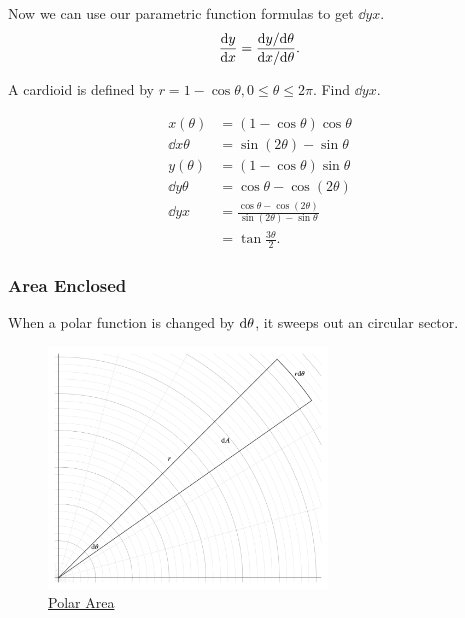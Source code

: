 Now we can use our parametric function formulas to get $\dd{y}{x}$.
\begin{equation*}
	\frac{\mathrm{d} y}{\mathrm{d} x} = \frac{\mathrm{d} y/\mathrm{d} \theta}{\mathrm{d} x/\mathrm{d} \theta}.
\end{equation*}

\begin{example}
	A cardioid is defined by $r=1-\cos{\theta}, 0 \leq \theta \leq 2\pi$.
	Find $\dd{y}{x}$.
\end{example}
\begin{answer}
	\begin{align*}
		x(\theta) &= \left(1-\cos{\theta}\right)\cos{\theta} \\
		\dd{x}{\theta} &= \sin{(2\theta)} - \sin{\theta} \\
		y(\theta) &= \left(1-\cos{\theta}\right)\sin{\theta} \\
		\dd{y}{\theta} &= \cos{\theta} - \cos{(2\theta)} \\
		\dd{y}{x} &= \frac{\cos{\theta} - \cos{(2\theta)}}{\sin{(2\theta)} - \sin{\theta}} \\
		&= \tan{\frac{3\theta}{2}}.
	\end{align*}
\end{answer}

\subsubsection{Area Enclosed}
When a polar function is changed by $\mathrm{d} \theta$, it sweeps out an circular sector.

\begin{figure}[H]
	\label{polar_area}
	\centering
	\includegraphics[width=0.66\textwidth]{./parametric_vector_polar/polar_area.png}
	\caption{\hyperref{}{}{}{Polar Area}}
\end{figure}

